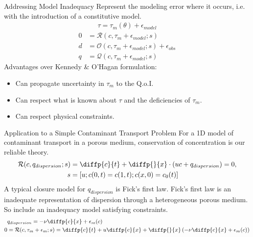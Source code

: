 \begin{frame}{Addressing Model Inadequacy}
Represent the modeling error where it occurs, i.e. with the introduction of a constitutive model.
\begin{align*}
  \tau = \tau_m( \theta ) + \epsilon_{model}
\end{align*}
\begin{align*}
  0 &= \mathcal{R}(c, \tau_m + \epsilon_{model}; s)\\
  d &= \mathcal{O}(c, \tau_m + \epsilon_{model}; s ) + \epsilon_{obs} \\
  q &= \mathcal{Q}(c, \tau_m + \epsilon_{model}; s )
  \end{align*}
  Advantages over Kennedy \& O'Hagan formulation:
  \begin{itemize}
    \item Can propagate uncertainty in $\tau_m$ to the Q.o.I.
    \item Can respect what is known about $\tau$ and the deficiencies of $\tau_m$.
    \item Can respect physical constraints.
  \end{itemize}
\end{frame}

\begin{frame}{ \large Application to a Simple Contaminant Transport Problem}
  For a 1D model of contaminant transport in a porous medium, conservation of concentration is our reliable theory.
  \begin{align*}
    \mathcal{R}(c, q_{dispersion}; s) &= \diffp{c}{t} + \diffp{}{x}\cdot( uc + q_{dispersion} ) = 0, \\
    s &= [ u; c(0,t) = c(1,t); c(x,0) = c_0(t) ]
  \end{align*}
  A typical closure model for $q_{dispersion}$ is Fick's first law.
  Fick's first law is an inadequate representation of dispersion through a heterogeneous porous medium.
  So include an inadequacy model satisfying constraints.
  \begin{align*}
    &q_{dispersion} = -\nu \diffp{c}{x} + \epsilon_m(c)\\
    0 &= \mathcal{R}(c, \tau_m + \epsilon_m; s ) = \diffp{c}{t} + u \diffp{c}{x} +   \diffp{}{x}\left( -\nu \diffp{c}{x} + \epsilon_m(c) \right)
  \end{align*}
\end{frame}

